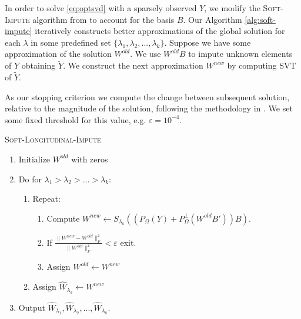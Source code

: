 \documentclass[preprint]{imsart}
\numberwithin{equation}{section}
\theoremstyle{plain}
\begin{document}
In order to solve \eqref{eq:optsvd} with a sparsely observed  $Y$, we modify the \textsc{Soft-Impute} algorithm from \citep{hastie2015matrix, mazumder2010spectral} to account for the basis $B$. Our Algorithm \ref{alg:soft-impute} iteratively constructs better approximations of the global solution for each $\lambda$ in some predefined set $\{\lambda_1, \lambda_2, ..., \lambda_k\}$. Suppose we have some approximation of the solution $W^{old}$. We use $W^{old}B$ to impute unknown elements of $Y$ obtaining $\tilde{Y}$. We construct the next approximation $W^{new}$ by computing SVT of $\tilde{Y}$.

As our stopping criterion we compute the change between subsequent solution, relative to the magnitude of the solution, following the methodology in \cite{cai2010singular}. We set some fixed threshold for this value, e.g. $\varepsilon = 10^{-4}$.

\begin{algorithm}
\caption{\textsc{Soft-Longitudinal-Impute}\label{alg:soft-impute}}
\begin{enumerate}
\item Initialize $W^{old}$ with zeros
\item Do for $\lambda_1 > \lambda_2 > ... > \lambda_k$:
\begin{enumerate}
\item Repeat:
\begin{enumerate}
\item Compute $W^{new} \leftarrow S_{\lambda_k}( (P_\Omega(Y) + P_\Omega^\perp(W^{old}B'))B )$.
\item If $\frac{\|W^{new} - W^{old}\|_F^2}{\|W^{old}\|_F^2} < \varepsilon$ exit.
\item Assign $W^{old} \leftarrow W^{new}$
\end{enumerate}
\item Assign $\hat{W}_{\lambda_k} \leftarrow W^{new}$
\end{enumerate}
\item Output $\hat{W}_{\lambda_1}, \hat{W}_{\lambda_2}, ... , \hat{W}_{\lambda_k}$.
\end{enumerate}
\end{algorithm}
\end{document}
